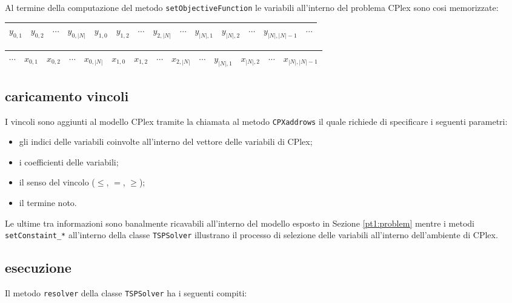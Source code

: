 Al termine della computazione del metodo \texttt{setObjectiveFunction} le variabili all'interno del problema CPlex sono cosi memorizzate:

\begin{tabular}{|c|c|c|c|c|c|c|c|c|c|c|c|c|c}
\hline 
$y_{0,1}$ & $y_{0,2}$ & $\cdots$ & $y_{0,\left|N\right|}$ & $y_{1,0}$ & $y_{1,2}$ & $ \cdots $ & $y_{2,\left|N\right|}$ & $\cdots$ & $y_{\left|N\right|,1}$ & $y_{\left|N\right|,2}$ & $\cdots$ & $y_{\left|N\right|,\left|N\right| - 1}$ & $\cdots$\\ 
\hline 
\end{tabular}

\begin{tabular}{c|c|c|c|c|c|c|c|c|c|c|c|c|c|}
\hline 
$\cdots$ & $x_{0,1}$ & $x_{0,2}$ & $\cdots$ & $x_{0,\left|N\right|}$ & $x_{1,0}$ & $x_{1,2}$ & $ \cdots $ & $x_{2,\left|N\right|}$ & $\cdots$ & $y_{\left|N\right|,1}$ & $x_{\left|N\right|,2}$ & $\cdots$ & $x_{\left|N\right|,\left|N\right| - 1}$\\ 
\hline 
\end{tabular}  

\subsection[Caricamento vincoli]{caricamento vincoli}
\label{pt1:solver:constraint}
I vincoli sono aggiunti al modello CPlex tramite la chiamata al metodo \texttt{CPXaddrows} il quale richiede di specificare i seguenti parametri:

\begin{itemize}
\item gli indici delle variabili coinvolte all'interno del vettore delle variabili di CPlex;
\item i coefficienti delle variabili;
\item il senso del vincolo ($\le$, $=$, $\ge$);
\item il termine noto.
\end{itemize}

Le ultime tra informazioni sono banalmente ricavabili all'interno del modello esposto in Sezione \ref{pt1:problem} mentre i metodi \texttt{setConstaint\_*} all'interno della classe \texttt{TSPSolver} illustrano il processo di selezione delle variabili all'interno dell'ambiente di CPlex.

\subsection[Esecuzione]{esecuzione}
\label{pt1:solver:esecution}
Il metodo \texttt{resolver} della classe \texttt{TSPSolver} ha i seguenti compiti:

